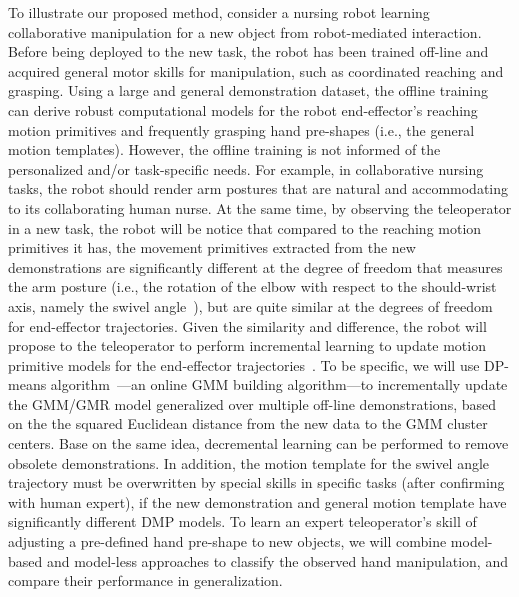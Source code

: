 \documentclass[letterpaper, 11 pt, onecolumn]{article}
\begin{document}
To illustrate our proposed method, consider a nursing robot learning collaborative manipulation for a new object from robot-mediated interaction. Before being deployed to the new task, the robot has been trained off-line and acquired general motor skills for manipulation, such as coordinated reaching and grasping. Using a large and general demonstration dataset, the offline training can derive robust computational models for the robot end-effector's reaching motion primitives and frequently grasping hand pre-shapes (i.e., the general motion templates). However, the offline training is not informed of the personalized and/or task-specific needs. For example, in collaborative nursing tasks, the robot should render arm postures that are natural and accommodating to its collaborating human nurse. At the same time, by observing the teleoperator in a new task, the robot will be notice that compared to the reaching motion primitives it has, the movement primitives extracted from the new demonstrations are significantly different at the degree of freedom that measures the arm posture (i.e., the rotation of the elbow with respect to the should-wrist axis, namely the swivel angle~\cite{Tolani_Badler:96}), but are quite similar at the degrees of freedom for end-effector trajectories. Given the similarity and difference, the robot will propose to the teleoperator to perform incremental learning to update motion primitive models for the end-effector trajectories~\cite{havoutis2016online}. To be specific, we will use DP-means algorithm~\cite{kulis2011revisiting}---an online GMM building algorithm---to incrementally update the GMM/GMR model generalized over multiple off-line demonstrations, based on the the squared Euclidean distance from the new data to the GMM cluster centers. Base on the same idea, decremental learning can be performed to remove obsolete demonstrations. In addition, the motion template for the swivel angle trajectory must be overwritten by special skills in specific tasks (after confirming with human expert), if the new demonstration and general motion template have significantly different DMP models. To learn an expert teleoperator's skill of adjusting a pre-defined hand pre-shape to new objects, we will combine model-based and model-less  approaches to classify the observed hand manipulation, and compare their performance in generalization. 
\end{document}
